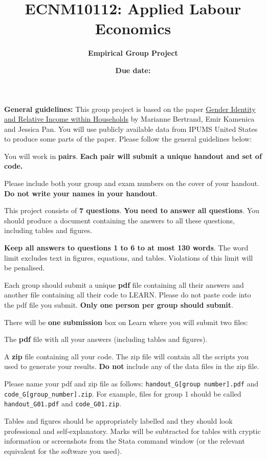 \documentclass[a4paper, 11pt,addpoints]{exam}
\title{\large{\textbf{ECNM10112: Applied Labour Economics}}}
\author{\textbf{Empirical Group Project}}
\date{\textbf{Due date:} \red{\textbf{Thursday,  6  November at 3 pm}}}
\begin{document}
\maketitle

\noindent\textbf{General guidelines:} This group project is based on the paper \href{https://academic.oup.com/qje/article/130/2/571/2330321}{Gender Identity and Relative Income within Households} by Marianne Bertrand, Emir Kamenica and Jessica Pan\nocite{Bertrand2015}. You will use publicly available data from IPUMS United States to produce some parts of the paper. Please follow the general guidelines below:

\bitem 
\item You will work in \textbf{pairs}. \textbf{Each pair will submit a unique handout and set of code.}
\item Please include both your group and exam numbers on the cover of your handout. \textbf{Do not write your names in your handout}.
\item This project consists of \textbf{7 questions}. \textbf{You need to answer all questions}. You should produce a document containing the answers to all these questions, including tables and figures.
\item \textbf{Keep all answers to questions 1 to 6 to at most 130 words}. The word limit excludes text in figures, equations, and tables. Violations of this limit will be penalised.
\item Each group should submit a unique \textbf{pdf} file containing all their answers and another file containing all their code to LEARN. Please do not paste code into the pdf file you submit. \textbf{Only one person per group should submit}.
\item There will be \textbf{one submission} box on Learn where you will submit two files: 
\bitem 
\item The \textbf{pdf} file with all your answers (including tables and figures).
\item A \textbf{zip} file containing all your code. The zip file will contain all the scripts you used to generate your results. \textbf{Do not} include any of the data files in the zip file.
\eitem 
\item Please name your pdf and zip file as follows: {\tt handout\_G[group number].pdf} and \\ {\tt code\_G[group\_number].zip}. For example, files for group 1 should be called {\tt handout\_G01.pdf} and {\tt code\_G01.zip}.
\item Tables and figures should be appropriately labelled and they should look professional and self-explanatory. Marks will be subtracted for tables with cryptic information or screenshots from the Stata command window (or the relevant equivalent for the software you used).
\end{document}
